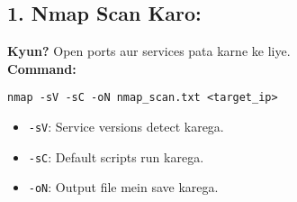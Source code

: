 \documentclass[a4paper]{article}
\begin{document}
\subsection{1. Nmap Scan Karo:}
\textbf{Kyun?} Open ports aur services pata karne ke liye. \\
\textbf{Command:} \\
\begin{lstlisting}
nmap -sV -sC -oN nmap_scan.txt <target_ip>  
\end{lstlisting}
\begin{itemize}
  \item \texttt{-sV}: Service versions detect karega.
  \item \texttt{-sC}: Default scripts run karega.
  \item \texttt{-oN}: Output file mein save karega.
\end{itemize}
\end{document}
